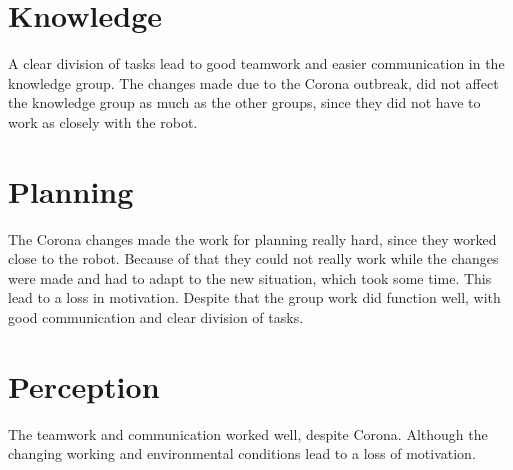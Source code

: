 \documentclass[main.tex]{subfiles}
\begin{document}
\section{Knowledge}

A clear division of tasks lead to good teamwork and easier communication in the knowledge group.
The changes made due to the Corona outbreak, did not affect the knowledge group as much as the other groups, since they did not have to work as closely with the robot.

\section{Planning}

The Corona changes made the work for planning really hard, since they worked close to the robot. Because of that they could not really work while the changes were made and had to adapt to the new situation, which took some time.
This lead to a loss in motivation. Despite that the group work did function well, with good communication and clear division of tasks.

\section{Perception}

The teamwork and communication worked well, despite Corona. Although the changing working and environmental conditions lead to a loss of motivation.


	
\end{document}
